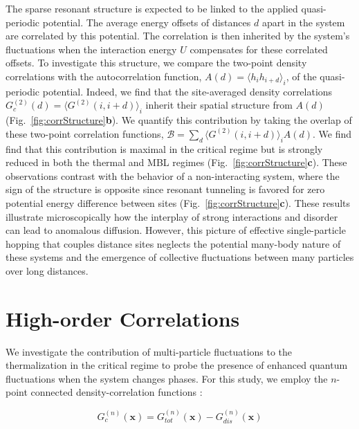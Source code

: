 The sparse resonant structure is expected to be linked to the applied quasi-periodic potential. The average energy offsets of distances $d$ apart in the system are correlated by this potential. The correlation is then inherited by the system's fluctuations when the interaction energy $U$ compensates for these correlated offsets. To investigate this structure, we compare the two-point density correlations with the autocorrelation function, $A(d) = \langle h_i h_{i+d} \rangle_i$, of the quasi-periodic potential. Indeed, we find that the site-averaged density correlations $G^{(2)}_c(d) = \langle G^{(2)} (i,i+d) \rangle_i$ inherit their spatial structure from $A(d)$ (Fig.~\ref{fig:corrStructure}\textbf{b}). We quantify this contribution by taking the overlap of these two-point correlation functions, $\mathcal{B} = \sum_d \langle G^{(2)} (i,i+d) \rangle_i A(d)$. We find find that this contribution is maximal in the critical regime but is strongly reduced in both the thermal and MBL regimes (Fig.~\ref{fig:corrStructure}\textbf{c}). These observations contrast with the behavior of a non-interacting system, where the sign of the structure is opposite since resonant tunneling is favored for zero potential energy difference between sites (Fig.~\ref{fig:corrStructure}\textbf{c}). These results illustrate microscopically how the interplay of strong interactions and disorder can lead to anomalous diffusion. However, this picture of effective single-particle hopping that couples distance sites neglects the potential many-body nature of these systems and the emergence of collective fluctuations between many particles over long distances.

\section{High-order Correlations}

We investigate the contribution of multi-particle fluctuations to the thermalization in the critical regime to probe the presence of enhanced quantum fluctuations when the system changes phases. For this study, we employ the $n$-point connected density-correlation functions \cite{Liu2016,Schweigler2017,Hodgman2017,Preiss2019}:

\begin{equation}
\label{eqn:gcon}
G^{(n)}_c(\textbf{x}) = G^{(n)}_{tot} (\textbf{x}) - G^{(n)}_{dis} (\textbf{x})
\end{equation}

